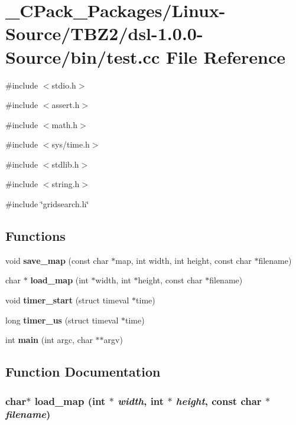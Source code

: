 \section{\_\-CPack\_\-Packages/Linux-\/Source/TBZ2/dsl-\/1.0.0-\/Source/bin/test.cc File Reference}
\label{__CPack__Packages_2Linux-Source_2TBZ2_2dsl-1_80_80-Source_2bin_2test_8cc}
{\ttfamily \#include $<$stdio.h$>$}\par
{\ttfamily \#include $<$assert.h$>$}\par
{\ttfamily \#include $<$math.h$>$}\par
{\ttfamily \#include $<$sys/time.h$>$}\par
{\ttfamily \#include $<$stdlib.h$>$}\par
{\ttfamily \#include $<$string.h$>$}\par
{\ttfamily \#include \char`\"{}gridsearch.h\char`\"{}}\par
\subsection*{Functions}
\begin{DoxyCompactItemize}
\item 
void {\bf save\_\-map} (const char $\ast$map, int width, int height, const char $\ast$filename)
\item 
char $\ast$ {\bf load\_\-map} (int $\ast$width, int $\ast$height, const char $\ast$filename)
\item 
void {\bf timer\_\-start} (struct timeval $\ast$time)
\item 
long {\bf timer\_\-us} (struct timeval $\ast$time)
\item 
int {\bf main} (int argc, char $\ast$$\ast$argv)
\end{DoxyCompactItemize}


\subsection{Function Documentation}
\subsubsection[{load\_\-map}]{\setlength{\rightskip}{0pt plus 5cm}char$\ast$ load\_\-map (int $\ast$ {\em width}, \/  int $\ast$ {\em height}, \/  const char $\ast$ {\em filename})}\label{__CPack__Packages_2Linux-Source_2TBZ2_2dsl-1_80_80-Source_2bin_2test_8cc_a358a7f4a8709529d700da886d011fb71}
